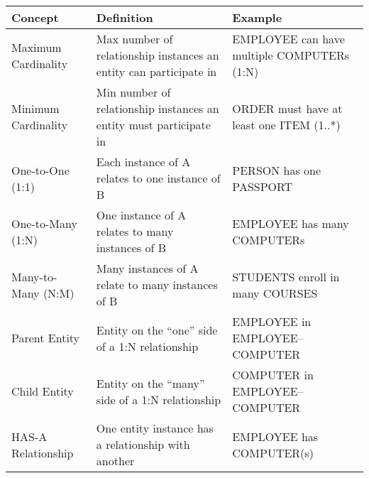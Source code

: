 \begin{NxLightBox}[title={Cardinality and Relationship Roles}]
	\begin{tabularx}{\linewidth}{|l|X|X|}
		\hline
		\textbf{Concept} & \textbf{Definition} & \textbf{Example} \\
		\hline
		Maximum Cardinality & Max number of relationship instances an entity can participate in & EMPLOYEE can have multiple COMPUTERs (1:N) \\
		\hline
		Minimum Cardinality & Min number of relationship instances an entity must participate in & ORDER must have at least one ITEM (1..*) \\
		\hline
		One-to-One (1:1) & Each instance of A relates to one instance of B & PERSON has one PASSPORT \\
		\hline
		One-to-Many (1:N) & One instance of A relates to many instances of B & EMPLOYEE has many COMPUTERs \\
		\hline
		Many-to-Many (N:M) & Many instances of A relate to many instances of B & STUDENTS enroll in many COURSES \\
		\hline
		Parent Entity & Entity on the “one” side of a 1:N relationship & EMPLOYEE in EMPLOYEE–COMPUTER \\
		\hline
		Child Entity & Entity on the “many” side of a 1:N relationship & COMPUTER in EMPLOYEE–COMPUTER \\
		\hline
		HAS-A Relationship & One entity instance has a relationship with another & EMPLOYEE has COMPUTER(s) \\
		\hline
	\end{tabularx}
\end{NxLightBox}

\bigskip

